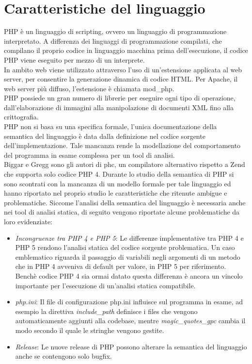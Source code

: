 \section{Caratteristiche del linguaggio}
PHP è un linguaggio di scripting, ovvero un linguaggio di programmazione interpretato. A differenza dei linguaggi di programmazione compilati, che compilano il proprio codice in linguaggio macchina prima dell'esecuzione, il codice PHP viene eseguito per mezzo di un interprete.\\
In ambito web viene utilizzato attraverso l'uso di un'estensione applicata al web server, per consentire la generazione dinamica di codice HTML. Per Apache, il web server più diffuso, l'estensione è chiamata mod\_php.\\
PHP possiede un gran numero di librerie per eseguire ogni tipo di operazione, dall'elaborazione di immagini alla manipolazione di documenti XML fino alla crittografia.\\
PHP non si basa su una specifica formale, l'unica documentazione della semantica del linguaggio è data dalla definizione nel codice sorgente dell'implementazione. Tale mancanza rende la modellazione del comportamento del programma in esame complessa per un tool di analisi.\\
Biggar e Gregg sono gli autori di phc\cite{phc}, un compilatore alternativo rispetto a Zend che supporta solo codice PHP 4. Durante lo studio della semantica di PHP si sono scontrati con la mancanza di un modello formale per tale linguaggio ed hanno riportato nel proprio studio\cite{biggar} le caratteristiche che ritenute ambigue e problematiche. Siccome l'analisi della semantica del linguaggio è necessaria anche nei tool di analisi statica, di seguito vengono riportate alcune problematiche da loro evidenziate:
\begin{itemize}
\item \emph{Incongruenze tra PHP 4 e PHP 5}: Le differenze implementative tra PHP 4 e PHP 5 rendono l'analisi statica del codice sorgente problematica. Un caso emblematico riguarda il passaggio di variabili negli argomenti di un metodo che in PHP 4 avveniva di default per valore, in PHP 5 per riferimento. Benchè codice PHP 4 sia ormai datato questa differenza è ancora un vincolo importante per l'esecuzione di un'analisi statica compatibile.
\item \emph{php.ini}: Il file di configurazione php.ini influisce sul programma in esame, ad esempio la direttiva \emph{include\_path} definisce i files che vengono automaticamente aggiunti alla codebase, mentre \emph{magic\_quotes\_gpc} cambia il modo secondo il quale le stringhe vengono gestite.
\item \emph{Release}: Le nuove release di PHP possono alterare la semantica del linguaggio anche se contengono solo bugfix.
\end{itemize}

